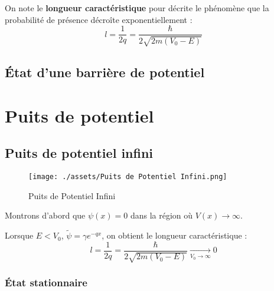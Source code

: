 On note le \textbf{longueur caractéristique} pour décrite le phénomène que la probabilité de présence décroîte exponentiellement : 
\begin{equation}
  l = \frac{1}{2q}  = \frac{\hbar}{ 2 \sqrt{2m (V_0 - E)}} 
\end{equation}


  



\subsection{État d'une barrière de potentiel} %


\newpage
\section{Puits de potentiel} %
\label{sec:Puits de potentiel}

\subsection{Puits de potentiel infini} %
\label{sub:Puits de potentiel infini}

\begin{figure}[H] %
  \centering
  \texttt{[image: ./assets/Puits de Potentiel Infini.png]}
  \caption{Puits de Potentiel Infini}
  \label{fig:Puits de Potentiel Infini}
\end{figure}

Montrons d'abord que $\psi (x) = 0$ dans la région où $V(x) \to \infty$. 

\begin{myproof}{}{}
Lorsque $E< V_0$, $\widetilde \psi = \gamma e ^{-qx}$, on obtient le longueur caractéristique : 
\begin{equation}
  l = \frac{1}{2q}  = \frac{\hbar}{2 \sqrt{2m (V_0 -E)}}  \underset{V_0 \to \infty}{\longrightarrow}  0
\end{equation}

\end{myproof}

\subsubsection{État stationnaire} %
\label{sec:État stationnaire}

